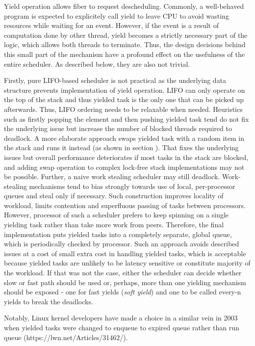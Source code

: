 \documentclass[12pt,a4paper,twoside]{report}
\begin{document}
Yield operation allows fiber to request descheduling. Commonly, a well-behaved program is expected to explicitely call yield to leave CPU to avoid wasting resources while waiting for an event. However, if the event is a result of computation done by other thread, yield becomes a strictly necessary part of the logic, which allows both threads to terminate. Thus, the design decisions behind this small part of the mechanism have a profound effect on the usefulness of the entire scheduler. As described below, they are also not trivial.

Firstly, pure LIFO-based scheduler is not practical as the underlying data structure prevents implementation of yield operation. LIFO can only operate on the top of the stack and thus yielded task is the only one that can be picked up afterwards. Thus, LIFO ordering needs to be relaxable when needed. Heuristics such as firstly popping the element and then pushing yielded task tend do not fix the underlying issue but increase the number of blocked threads required to deadlock. A more elaborate approach swaps yielded task with a random item in the stack and runs it instead (as shown in section ). That fixes the underlying issues but overall performance deteriorates if most tasks in the stack are blocked, and adding swap operation to complex lock-free stack implementations may not be possible. Further, a naive work stealing scheduler may still deadlock. Work-stealing mechanisms tend to bias strongly towards use of local, per-processor queues and steal only if necessary. Such construction improves locality of workload, limits contention and superfluous passing of tasks between processors. However, processor of such a scheduler prefers to keep spinning on a single yielding task rather than take more work from peers. Therefore, the final implementation puts yielded tasks into a completely separate, global queue, which is periodically checked by processor. Such an approach avoids described issues at a cost of small extra cost in handling yielded tasks, which is acceptable because yielded tasks are unlikely to be latency sensitive or constitute majority of the workload. If that was not the case, either the scheduler can decide whether slow or fast path should be used or, perhaps, more than one yielding mechanism should be exposed - one for fast yields (\textit{soft yield}) and one to be called every-n yields to break the deadlocks. 

Notably, Linux kernel developers have made a choice in a similar vein in 2003 when yielded tasks were changed to enqueue to expired queue rather than run queue  (https://lwn.net/Articles/31462/). 
\end{document}
